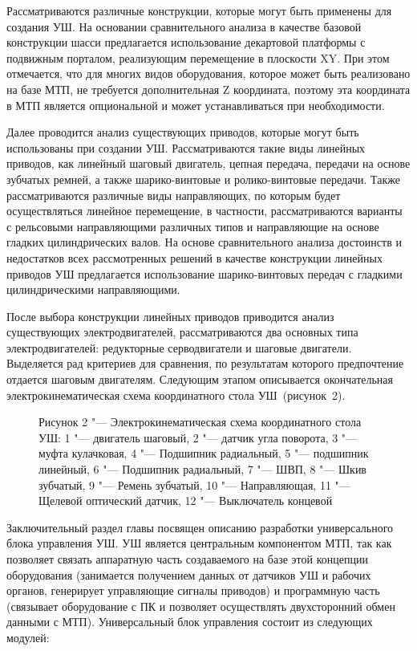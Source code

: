 Рассматриваются различные конструкции, которые могут быть применены для создания УШ. На основании сравнительного анализа в качестве базовой конструкции шасси предлагается использование декартовой платформы с подвижным порталом, реализующим перемещение в плоскости XY. При этом отмечается, что для многих видов оборудования, которое может быть реализовано на базе МТП, не требуется дополнительная Z координата, поэтому эта координата в МТП является опциональной и может устанавливаться при необходимости.

Далее проводится анализ существующих приводов, которые могут быть использованы при создании УШ. Рассматриваются такие виды линейных приводов, как линейный шаговый двигатель, цепная передача, передачи на основе зубчатых ремней, а также шарико-винтовые  и ролико-винтовые передачи. Также рассматриваются различные виды направляющих, по которым будет осуществляться линейное перемещение, в частности, рассматриваются варианты с рельсовыми направляющими различных типов и направляющие на основе гладких цилиндрических валов. На основе сравнительного анализа достоинств и недостатков всех рассмотренных решений в качестве конструкции линейных приводов УШ предлагается использование шарико-винтовых передач с гладкими цилиндрическими направляющими.

После выбора конструкции линейных приводов приводится анализ существующих электродвигателей, рассматриваются два основных типа электродвигателей: редукторные серводвигатели и шаговые двигатели. Выделяется рад критериев для сравнения, по результатам которого предпочтение отдается шаговым двигателям. Следующим этапом описывается окончательная электрокинематическая схема координатного стола УШ~(рисунок~2).

\begin{figure}[ht]
	\caption*{Рисунок 2 "--- Электрокинематическая схема координатного стола УШ: 1 "--- двигатель шаговый, 2 "--- датчик угла поворота, 3 "--- муфта кулачковая, 4 "--- Подшипник радиальный, 5 "--- подшипник линейный, 6 "--- Подшипник радиальный, 7 "--- ШВП, 8 "--- Шкив зубчатый, 9 "--- Ремень зубчатый, 10 "--- Направляющая, 11 "--- Щелевой оптический датчик, 12 "--- Выключатель концевой}\label{fig:scheme}
\end{figure}

Заключительный раздел главы посвящен описанию разработки универсального блока управления УШ. УШ является центральным компонентом МТП, так как позволяет связать аппаратную часть создаваемого на базе этой концепции оборудования (занимается получением данных от датчиков УШ и рабочих органов, генерирует управляющие сигналы приводов) и программную часть (связывает оборудование с ПК и позволяет осуществлять двухсторонний обмен данными с МТП). Универсальный блок управления состоит из следующих модулей:

